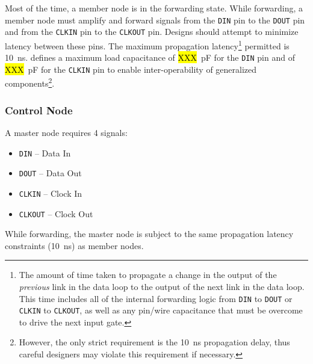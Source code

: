 Most of the time, a member node is in the {\sc forwarding} state. While
forwarding, a member node must amplify and forward signals from the {\tt DIN}
pin to the {\tt DOUT} pin and from the {\tt CLKIN} pin to the {\tt CLKOUT} pin.
Designs should attempt to minimize latency between these pins. The maximum
propagation latency\footnote{
  The amount of time taken to propagate a change in the output of the {\em
  previous} link in the data loop to the output of the next link in the data
  loop. This time includes all of the internal forwarding logic from {\tt DIN}
  to {\tt DOUT} or {\tt CLKIN} to {\tt CLKOUT}, as well as any pin/wire
  capacitance that must be overcome to drive the next input gate.
  }
permitted is 10~ns. \bus defines a maximum load capacitance of \hl{XXX}~pF for
the {\tt DIN} pin and of \hl{XXX}~pF for the {\tt CLKIN} pin to enable
inter-operability of generalized components\footnote{
  However, the only strict requirement is the 10~ns propagation delay, thus
  careful designers may violate this requirement if necessary.
  }.

\subsubsection{Control Node}
\label{sec:physical-master}
A master node requires 4 signals:

\begin{itemize}
  \item {\tt DIN} -- Data In
  \item {\tt DOUT} -- Data Out
  \item {\tt CLKIN} -- Clock In
  \item {\tt CLKOUT} -- Clock Out
\end{itemize}

While forwarding, the master node is subject to the same propagation latency
constraints (10~ns) as member nodes.


